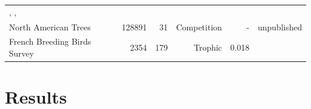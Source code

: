 \begin{landscape}
\begin{longtable}[]{@{}lrrrrr@{}}
\begin{minipage}[t]{0.27\columnwidth}
\citet{MartinGonzalez2015}, \citet{Sonne2016}, \citet{Lack1973}\strut
\end{minipage}\tabularnewline
\begin{minipage}[t]{0.18\columnwidth}\raggedright\strut
North American Trees\strut
\end{minipage} & \begin{minipage}[t]{0.08\columnwidth}\raggedleft\strut
128891\strut
\end{minipage} & \begin{minipage}[t]{0.09\columnwidth}\raggedleft\strut
31\strut
\end{minipage} & \begin{minipage}[t]{0.13\columnwidth}\raggedleft\strut
Competition\strut
\end{minipage} & \begin{minipage}[t]{0.08\columnwidth}\raggedleft\strut
-\strut
\end{minipage} & \begin{minipage}[t]{0.27\columnwidth}\raggedleft\strut
unpublished\strut
\end{minipage}\tabularnewline
\begin{minipage}[t]{0.18\columnwidth}\raggedright\strut
French Breeding Birds Survey\strut
\end{minipage} & \begin{minipage}[t]{0.08\columnwidth}\raggedleft\strut
2354\strut
\end{minipage} & \begin{minipage}[t]{0.09\columnwidth}\raggedleft\strut
179\strut
\end{minipage} & \begin{minipage}[t]{0.13\columnwidth}\raggedleft\strut
Trophic\strut
\end{minipage} & \begin{minipage}[t]{0.08\columnwidth}\raggedleft\strut
0.018\strut
\end{minipage} & \begin{minipage}[t]{0.27\columnwidth}\raggedleft\strut
\citet{Gauzere2015}\strut
\end{minipage}\tabularnewline
\bottomrule
\end{longtable}

\end{landscape}



\section{Results}\label{results}

